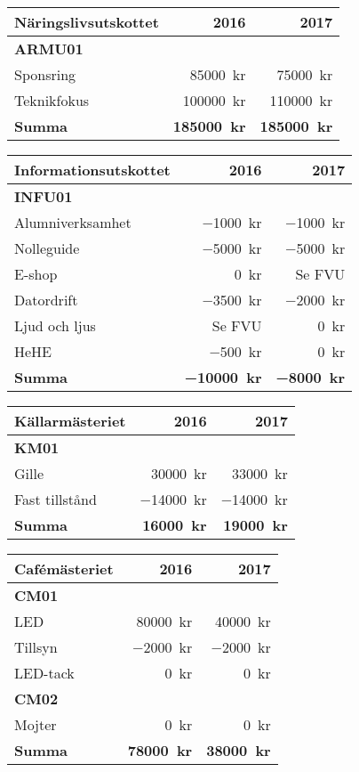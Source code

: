 \documentclass[10pt]{article}
\begin{document}
\begin{tabularx}{10cm}{X r r}
    \textbf{\large Näringslivsutskottet} & \textbf{2016} & \textbf{2017} \\
    \hline
    \textbf{ARMU01} \\
    Sponsring & \SI{85000}{kr} & \SI{75000}{kr} \\
    Teknikfokus & \SI{100000}{kr} & \SI{110000}{kr} \\
    \hline
    \textbf{Summa} & \textbf{\SI{185000}{kr}} & \textbf{\SI{185000}{kr}} \\
\end{tabularx}

\begin{tabularx}{10cm}{X r r}
    \textbf{\large Informationsutskottet} & \textbf{2016} & \textbf{2017} \\
    \hline
    \textbf{INFU01} \\
    Alumniverksamhet & \SI{-1000}{kr} & \SI{-1000}{kr} \\
    Nolleguide & \SI{-5000}{kr} & \SI{-5000}{kr} \\
    E-shop & \SI{0}{kr} & Se FVU \\
    Datordrift & \SI{-3500}{kr} & \SI{-2000}{kr} \\
    Ljud och ljus & Se FVU & \SI{0}{kr} \\
    HeHE & \SI{-500}{kr} & \SI{0}{kr} \\
    \hline
    \textbf{Summa} & \textbf{\SI{-10000}{kr}} & \textbf{\SI{-8000}{kr}} \\
\end{tabularx}

\begin{tabularx}{10cm}{X r r}
    \textbf{\large Källarmästeriet} & \textbf{2016} & \textbf{2017} \\
    \hline
    \textbf{KM01} \\
    Gille & \SI{30000}{kr} & \SI{33000}{kr} \\
    Fast tillstånd & \SI{-14000}{kr} & \SI{-14000}{kr} \\
    \hline
    \textbf{Summa} & \textbf{\SI{16000}{kr}} & \textbf{\SI{19000}{kr}} \\
\end{tabularx}

\begin{tabularx}{10cm}{X r r}
    \textbf{\large Cafémästeriet} & \textbf{2016} & \textbf{2017} \\
    \hline
    \textbf{CM01} \\
    LED & \SI{80000}{kr} & \SI{40000}{kr} \\
    Tillsyn & \SI{-2000}{kr} & \SI{-2000}{kr} \\
    LED-tack & \SI{0}{kr} & \SI{0}{kr} \\
    \textbf{CM02} \\
    Mojter & \SI{0}{kr} & \SI{0}{kr} \\
    \hline
    \textbf{Summa} & \textbf{\SI{78000}{kr}} & \textbf{\SI{38000}{kr}} \\
\end{tabularx}
\end{document}
